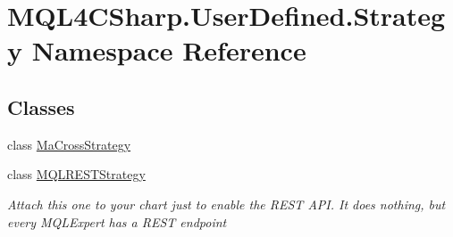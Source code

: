 \hypertarget{namespace_m_q_l4_c_sharp_1_1_user_defined_1_1_strategy}{}\section{M\+Q\+L4\+C\+Sharp.\+User\+Defined.\+Strategy Namespace Reference}
\label{namespace_m_q_l4_c_sharp_1_1_user_defined_1_1_strategy}
\subsection*{Classes}
\begin{DoxyCompactItemize}
\item 
class \hyperlink{class_m_q_l4_c_sharp_1_1_user_defined_1_1_strategy_1_1_ma_cross_strategy}{Ma\+Cross\+Strategy}
\item 
class \hyperlink{class_m_q_l4_c_sharp_1_1_user_defined_1_1_strategy_1_1_m_q_l_r_e_s_t_strategy}{M\+Q\+L\+R\+E\+S\+T\+Strategy}
\begin{DoxyCompactList}\small\item\em Attach this one to your chart just to enable the R\+E\+ST A\+PI. It does nothing, but every M\+Q\+L\+Expert has a R\+E\+ST endpoint \end{DoxyCompactList}\end{DoxyCompactItemize}
